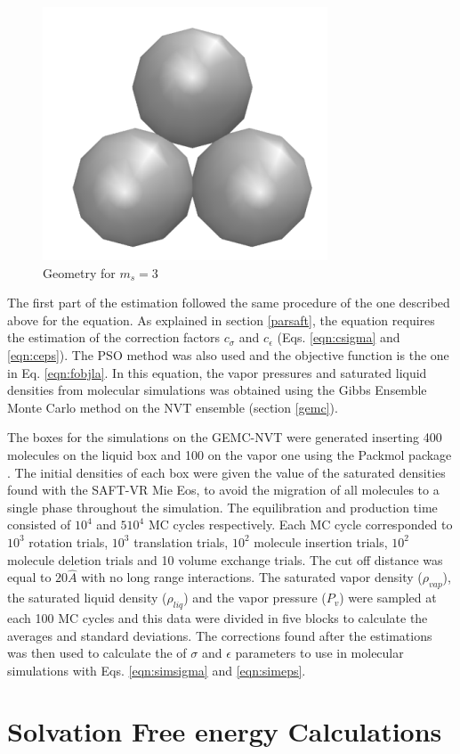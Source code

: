 \begin{figure}[th]
	\centering
	\includegraphics[width=0.15\linewidth]{Figures/fe3}
	\caption{Geometry for $m_{s}=3$}
	\label{fig:fen3}
\end{figure}

The first part of the estimation followed the same procedure of the one described above for the  equation. As explained in section \ref{parsaft}, the  equation requires the estimation of the correction factors $c_{\sigma}$ and $c_{\epsilon}$ (Eqs. \eqref{eqn:csigma} and \eqref{eqn:ceps}). The PSO method was also used and the objective function is the one in Eq. \eqref{eqn:fobjla}. In this equation, the vapor pressures and saturated liquid densities from molecular simulations was obtained using the Gibbs Ensemble Monte Carlo method on the NVT ensemble  (section \ref{gemc}).

The boxes for the simulations on the GEMC-NVT were generated inserting 400 molecules on the liquid box and 100 on the vapor one using the Packmol package \cite{packmol}. The initial densities of each box were given the value of the saturated densities found with the SAFT-VR Mie Eos, to avoid the migration of all molecules to a single phase throughout the simulation. The equilibration and production time consisted of $10^{4}$ and $5 10^{4}$ MC cycles respectively. Each MC cycle corresponded to $10^3$ rotation trials, $10^3$ translation trials, $10^2$ molecule insertion trials, $10^2$ molecule deletion trials and 10 volume exchange trials. The cut off distance was equal to $20 \hat{A}$ with no long range interactions. The saturated vapor density ($\rho_{vap}$), the saturated liquid density ($\rho_{liq}$) and the vapor pressure ($P_{v}$) were sampled at each 100 MC cycles and this data were divided in five blocks to calculate the averages and standard deviations. The corrections found after the estimations was then used to calculate the of $\sigma$ and $\epsilon$ parameters to use in molecular simulations with Eqs. \eqref{eqn:simsigma} and \eqref{eqn:simeps}.

\section{Solvation Free energy Calculations}\label{solvme}

